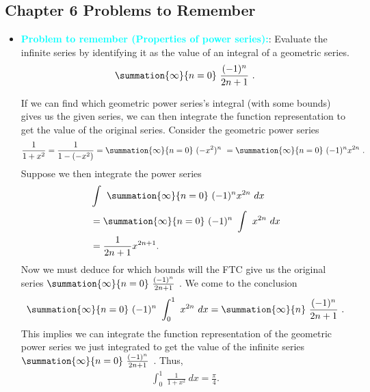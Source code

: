 \documentclass{report}
\begin{document}
\subsection{Chapter 6 Problems to Remember}
\begin{itemize}
    \item \textbf{\textcolor{cyan}{Problem to remember (Properties of power series):}}: Evaluate the infinite series by identifying it as the value of an integral of a geometric series.
        \begin{align*}
            \summation{\infty}{n=0}\ \frac{(-1)^{n}}{2n+1}\ 
        .\end{align*}
        \begin{remark}
            If we can find which geometric power series's integral (with some bounds) gives us the given series, we can then integrate the function representation to get the value of the original series. Consider the geometric power series
            \begin{align*}
                \frac{1}{1+x^{2}} = \frac{1}{1-(-x^{2})} = \summation{\infty}{n=0}\ (-x^{2})^{n}\  = \summation{\infty}{n=0}\ (-1)^{n}x^{2n}\ 
            .\end{align*}
            Suppose we then integrate the power series
            \begin{align*}
                        &\int_{}^{}\ \summation{\infty}{n=0}\ (-1)^{n}x^{2n}\ dx \\
                        &=\summation{\infty}{n=0}\ (-1)^{n}\ \int_{}^{}\ x^{2n}\ dx \\
                        &=\frac{1}{2n+1}x^{2n+1}
                    .\end{align*}
                    Now we must deduce for which bounds will the FTC give us the original series $\summation{\infty}{n=0}\ \frac{(-1)^{n}}{2n+1}\  $. We come to the conclusion
                    \begin{align*}
                        \summation{\infty}{n=0}\ (-1)^{n}\ \int_{0}^{1}\ x^{2n}\ dx = \summation{\infty}{n}\ \frac{(-1)^{n}}{2n+1}\ 
                    .\end{align*}
                    This implies we can integrate the function representation of the geometric power series we just integrated to get the value of the infinite series $\summation{\infty}{n=0}\ \frac{(-1)^{n}}{2n+1}\  $. Thus,
                    \begin{align*}
                        \int_{0}^{1}\ \frac{1}{1+x^{2}}\ dx = \frac{\pi}{4}
                    .\end{align*}

\end{remark}
\end{itemize}
\end{document}
